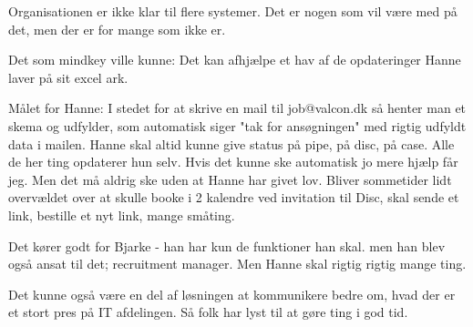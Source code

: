 Organisationen er ikke klar til flere systemer. Det er nogen som vil være med på det, men der er for mange som ikke er.


Det som mindkey ville kunne:
Det kan afhjælpe et hav af de opdateringer Hanne laver på sit excel ark. 


Målet for Hanne:
I stedet for at skrive en mail til job@valcon.dk så henter man et skema og udfylder, som automatisk siger "tak for ansøgningen" med rigtig udfyldt data i mailen.
Hanne skal altid kunne give status på pipe, på disc, på case. Alle de her ting opdaterer hun selv. Hvis det kunne ske automatisk jo mere hjælp får jeg.
Men det må aldrig ske uden at Hanne har givet lov.
Bliver sommetider lidt overvældet over at skulle booke i 2 kalendre ved invitation til Disc, skal sende et link, bestille et nyt link, mange småting. 

Det kører godt for Bjarke - han har kun de funktioner han skal. men han blev også ansat til det; recruitment manager. Men Hanne skal rigtig rigtig mange ting.


Det kunne også være en del af løsningen at kommunikere bedre om, hvad der er et stort pres på IT afdelingen. Så folk har lyst til at gøre ting i god tid.

